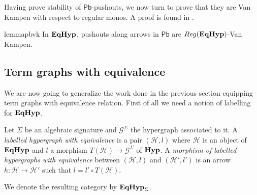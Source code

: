 \documentclass[a4paper,UKenglish,cleveref,pdftex,thm-restate,numberwithinsect]{lipics-v2021}
\newcommand{\pbc}{\mathsf{Pb}}
\newcommand{\catname}[1]{\textbf{\textup{#1}}}
\newcommand{\hyp}{\catname{Hyp}}
\newcommand{\EqHyp}{\catname{EqHyp}} %
\newcommand{\reg}{\mathsf{Reg}}
\begin{document}
\begin{example}
\begin{minipage}[r]{.60\linewidth}
{                 }
  \end{minipage}
\end{example}


Having prove stability of $\pbc$-pushouts, we now turn to prove that they are Van Kampen with respect to regular monos.
%
A proof is found in .

\begin{restatable}{lemma}{pbvk}\label{lemma:van_kampen}
	In $\EqHyp$, pushouts along arrows in $\pbc$ are $\reg(\EqHyp)$-Van Kampen.
\end{restatable}

%
%

\subsection{Term graphs with equivalence}


We are now going to generalize the work done in the previous section equipping term graphs with equivalence relation. First of all we need a notion of labelling for $\EqHyp$. 

\begin{definition}
	Let $\Sigma$ be an algebraic signature and $\mathcal{G}^{\Sigma}$ the hypergraph associated to it. A \emph{labelled hypergraph with equivalence} is a pair $(\mathcal{H}, l)$ where $\mathcal{H}$ is an object of $\EqHyp$ and $l$ a morphism $T(\mathcal{H})\to \mathcal{G}^\Sigma$ of $\hyp$. A \emph{morphism of labelled hypergraphs with equivalence} between $(\mathcal{H}, l)$ and $(\mathcal{H}', l')$ is an arrow $h\colon \mathcal{H}\to \mathcal{H}'$ such that $l= l'\circ T(\mathcal{H})$.
	
	We denote the resulting category by $\EqHyp_\Sigma$.
\end{definition}
\end{document}
